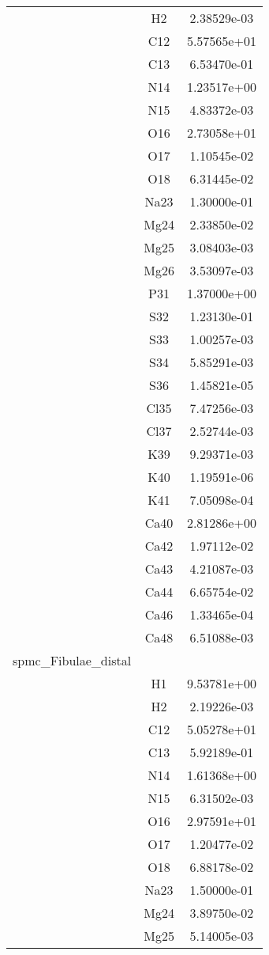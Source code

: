 \begin{centering}
\begin{longtable}{l c c}
& H2 & 2.38529e-03 \\ 
& C12 & 5.57565e+01 \\ 
& C13 & 6.53470e-01 \\ 
& N14 & 1.23517e+00 \\ 
& N15 & 4.83372e-03 \\ 
& O16 & 2.73058e+01 \\ 
& O17 & 1.10545e-02 \\ 
& O18 & 6.31445e-02 \\ 
& Na23 & 1.30000e-01 \\ 
& Mg24 & 2.33850e-02 \\ 
& Mg25 & 3.08403e-03 \\ 
& Mg26 & 3.53097e-03 \\ 
& P31 & 1.37000e+00 \\ 
& S32 & 1.23130e-01 \\ 
& S33 & 1.00257e-03 \\ 
& S34 & 5.85291e-03 \\ 
& S36 & 1.45821e-05 \\ 
& Cl35 & 7.47256e-03 \\ 
& Cl37 & 2.52744e-03 \\ 
& K39 & 9.29371e-03 \\ 
& K40 & 1.19591e-06 \\ 
& K41 & 7.05098e-04 \\ 
& Ca40 & 2.81286e+00 \\ 
& Ca42 & 1.97112e-02 \\ 
& Ca43 & 4.21087e-03 \\ 
& Ca44 & 6.65754e-02 \\ 
& Ca46 & 1.33465e-04 \\ 
& Ca48 & 6.51088e-03 \\ 
\hline
spmc\_Fibulae\_distal & & \\
\hline
& H1 & 9.53781e+00 \\ 
& H2 & 2.19226e-03 \\ 
& C12 & 5.05278e+01 \\ 
& C13 & 5.92189e-01 \\ 
& N14 & 1.61368e+00 \\ 
& N15 & 6.31502e-03 \\ 
& O16 & 2.97591e+01 \\ 
& O17 & 1.20477e-02 \\ 
& O18 & 6.88178e-02 \\ 
& Na23 & 1.50000e-01 \\ 
& Mg24 & 3.89750e-02 \\ 
& Mg25 & 5.14005e-03 \\ 

\end{longtable}
\end{centering}
